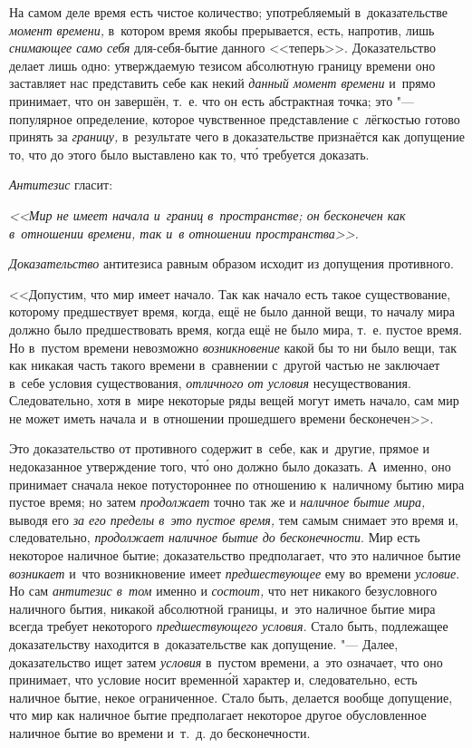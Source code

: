 На самом деле время есть чистое количество; употребляемый в~доказательстве
{\em момент времени,} в~котором время якобы прерывается, есть, напротив,
лишь {\em снимающее само себя} для-себя-бытие данного <<теперь>>.
Доказательство делает лишь одно: утверждаемую тезисом абсолютную границу
времени оно заставляет нас представить себе как некий
{\em данный момент времени} и~прямо принимает, что он завершён, т.~е. что он
есть абстрактная точка; это "--- популярное определение, которое чувственное
представление с~лёгкостью готово принять за {\em границу,} в~результате чего
в доказательстве признаётся как допущение то, что до этого было выставлено как
то, чт\'{о} требуется доказать.

{\em Антитезис} гласит:

{\em <<Мир не имеет начала и~границ в~пространстве; он бесконечен
как в~отношении времени, так и~в отношении пространства>>.}

{\em Доказательство} антитезиса равным образом исходит из допущения противного.

<<Допустим, что мир имеет начало. Так как начало есть такое существование,
которому предшествует время, когда, ещё не было данной вещи, то началу мира
должно было предшествовать время, когда ещё не было мира, т.~е. пустое время.
Но в~пустом времени невозможно {\em возникновение} какой бы то ни было вещи,
так как никакая часть такого времени в~сравнении с~другой частью не заключает
в~себе условия существования, {\em отличного от условия} несуществования.
Следовательно, хотя в~мире некоторые ряды вещей могут иметь начало,
сам мир не может иметь начала и~в отношении прошедшего времени бесконечен>>.

Это доказательство от противного содержит в~себе, как и~другие, прямое и
недоказанное утверждение того, чт\'{о} оно должно было доказать. А~именно, оно
принимает сначала некое потустороннее по отношению к~наличному бытию мира
пустое время; но затем {\em продолжает} точно так же и
{\em наличное бытие мира,} выводя его {\em за его пределы в~это пустое время,}
тем самым снимает это время и, следовательно,
{\em продолжает наличное бытие до бесконечности}. Мир есть некоторое
наличное бытие; доказательство предполагает, что это наличное бытие
{\em возникает} и~что возникновение имеет {\em предшествующее} ему во времени
{\em условие}. Но сам {\em антитезис в~том} именно и {\em состоит,} что нет
никакого безусловного наличного бытия, никакой абсолютной границы, и~это наличное
бытие мира всегда требует некоторого {\em предшествующего условия}. Стало
быть, подлежащее доказательству находится в~доказательстве как
допущение. "--- Далее, доказательство ищет затем {\em условия} в~пустом
времени, а~это означает, что оно принимает, что условие носит временн\'{о}й
характер и, следовательно, есть наличное бытие, некое ограниченное. Стало быть,
делается вообще допущение, что мир как наличное бытие предполагает некоторое
другое обусловленное наличное бытие во времени и~т.~д. до бесконечности.

